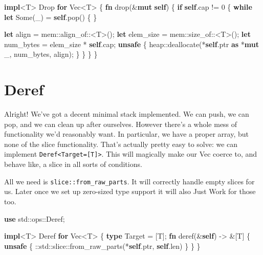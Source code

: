 \documentclass[a4paper,]{book}
\newenvironment{Shaded}{\begin{snugshade}}{\end{snugshade}}
\newcommand{\KeywordTok}[1]{\textcolor[rgb]{0.13,0.29,0.53}{\textbf{{#1}}}}
\newcommand{\DataTypeTok}[1]{\textcolor[rgb]{0.13,0.29,0.53}{{#1}}}
\newcommand{\DecValTok}[1]{\textcolor[rgb]{0.00,0.00,0.81}{{#1}}}
\newcommand{\ConstantTok}[1]{\textcolor[rgb]{0.00,0.00,0.00}{{#1}}}
\newcommand{\BuiltInTok}[1]{{#1}}
\newcommand{\NormalTok}[1]{{#1}}
\begin{document}
\begin{Shaded}
\begin{Highlighting}[]
\KeywordTok{impl}\NormalTok{<T> }\BuiltInTok{Drop} \KeywordTok{for} \DataTypeTok{Vec}\NormalTok{<T> \{}
    \KeywordTok{fn} \NormalTok{drop(&}\KeywordTok{mut} \KeywordTok{self}\NormalTok{) \{}
        \KeywordTok{if} \KeywordTok{self}\NormalTok{.cap != }\DecValTok{0} \NormalTok{\{}
            \KeywordTok{while} \KeywordTok{let} \ConstantTok{Some}\NormalTok{(_) = }\KeywordTok{self}\NormalTok{.pop() \{ \}}

            \KeywordTok{let} \NormalTok{align = mem::align_of::<T>();}
            \KeywordTok{let} \NormalTok{elem_size = mem::size_of::<T>();}
            \KeywordTok{let} \NormalTok{num_bytes = elem_size * }\KeywordTok{self}\NormalTok{.cap;}
            \KeywordTok{unsafe} \NormalTok{\{}
                \NormalTok{heap::deallocate(*}\KeywordTok{self}\NormalTok{.ptr }\KeywordTok{as} \NormalTok{*}\KeywordTok{mut} \NormalTok{_, num_bytes, align);}
            \NormalTok{\}}
        \NormalTok{\}}
    \NormalTok{\}}
\NormalTok{\}}
\end{Highlighting}
\end{Shaded}

\section{Deref}\label{sec--vec-deref}

Alright! We've got a decent minimal stack implemented. We can push, we
can pop, and we can clean up after ourselves. However there's a whole
mess of functionality we'd reasonably want. In particular, we have a
proper array, but none of the slice functionality. That's actually
pretty easy to solve: we can implement
\texttt{Deref\textless{}Target={[}T{]}\textgreater{}}. This will
magically make our Vec coerce to, and behave like, a slice in all sorts
of conditions.

All we need is \texttt{slice::from\_raw\_parts}. It will correctly
handle empty slices for us. Later once we set up zero-sized type support
it will also Just Work for those too.

\begin{Shaded}
\begin{Highlighting}[]
\KeywordTok{use} \NormalTok{std::ops::Deref;}

\KeywordTok{impl}\NormalTok{<T> Deref }\KeywordTok{for} \DataTypeTok{Vec}\NormalTok{<T> \{}
    \KeywordTok{type} \NormalTok{Target = [T];}
    \KeywordTok{fn} \NormalTok{deref(&}\KeywordTok{self}\NormalTok{) -> &[T] \{}
        \KeywordTok{unsafe} \NormalTok{\{}
            \NormalTok{::std::slice::from_raw_parts(*}\KeywordTok{self}\NormalTok{.ptr, }\KeywordTok{self}\NormalTok{.len)}
        \NormalTok{\}}
    \NormalTok{\}}
\NormalTok{\}}
\end{Highlighting}
\end{Shaded}
\end{document}
